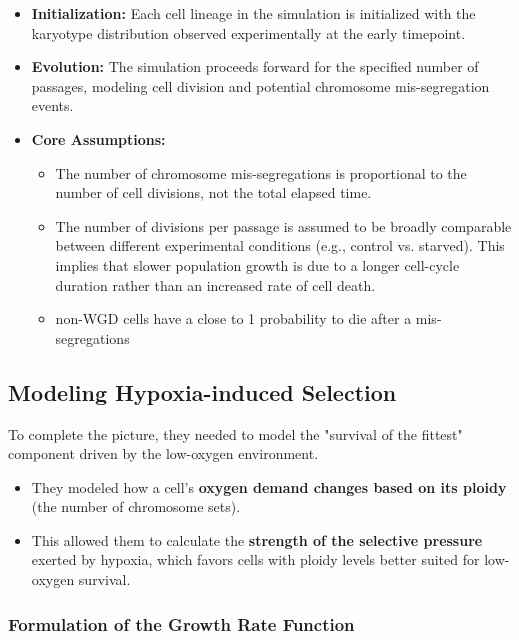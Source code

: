 \documentclass{article}
\begin{document}
\begin{itemize}
    \item \textbf{Initialization:} Each cell lineage in the simulation is initialized with the karyotype distribution observed experimentally at the early timepoint.

    \item \textbf{Evolution:} The simulation proceeds forward for the specified number of passages, modeling cell division and potential chromosome mis-segregation events.

    \item \textbf{Core Assumptions:}
    \begin{itemize}
        \item The number of chromosome mis-segregations is proportional to the number of cell divisions, not the total elapsed time.
        \item The number of divisions per passage is assumed to be broadly comparable between different experimental conditions (e.g., control vs. starved). This implies that slower population growth is due to a longer cell-cycle duration rather than an increased rate of cell death.
        \color{blue}
        \item non-WGD cells have a close to 1 probability to die after a mis-segregations
        \color{black}
    \end{itemize}
\end{itemize}

\subsection{Modeling Hypoxia-induced Selection}
To complete the picture, they needed to model the "survival of the fittest" component driven by the low-oxygen environment.
\begin{itemize}
    \item They modeled how a cell's \textbf{oxygen demand changes based on its ploidy} (the number of chromosome sets).
    \item This allowed them to calculate the \textbf{strength of the selective pressure} exerted by hypoxia, which favors cells with ploidy levels better suited for low-oxygen survival.
\end{itemize}

\subsubsection*{Formulation of the Growth Rate Function}
\end{document}
